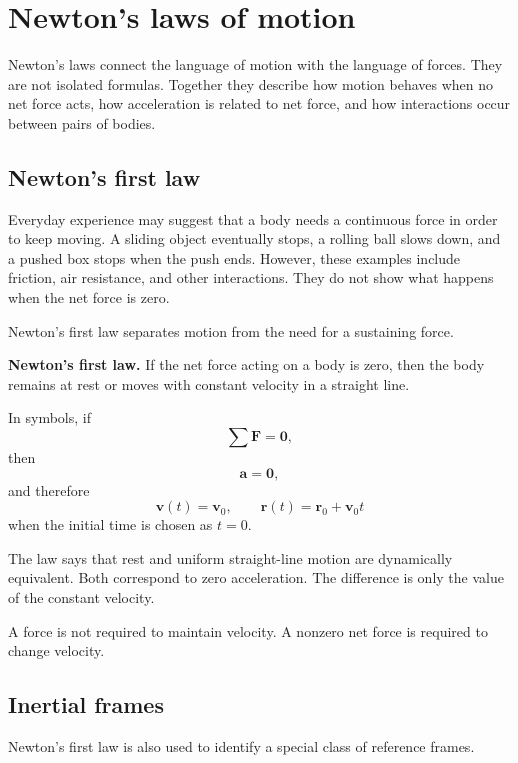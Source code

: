 \section{Newton's laws of motion}

Newton's laws connect the language of motion with the language of forces. They are not isolated formulas. Together they describe how motion behaves when no net force acts, how acceleration is related to net force, and how interactions occur between pairs of bodies.

\subsection{Newton's first law}

Everyday experience may suggest that a body needs a continuous force in order to keep moving. A sliding object eventually stops, a rolling ball slows down, and a pushed box stops when the push ends. However, these examples include friction, air resistance, and other interactions. They do not show what happens when the net force is zero.

Newton's first law separates motion from the need for a sustaining force.

\begin{theorembox}
\textbf{Newton's first law.} If the net force acting on a body is zero, then the body remains at rest or moves with constant velocity in a straight line.
\end{theorembox}

In symbols, if
\[
\sum \mathbf{F}=\mathbf{0},
\]
then
\[
\mathbf{a}=\mathbf{0},
\]
and therefore
\[
\mathbf{v}(t)=\mathbf{v}_0,
\qquad
\mathbf{r}(t)=\mathbf{r}_0+\mathbf{v}_0t
\]
when the initial time is chosen as \(t=0\).

The law says that rest and uniform straight-line motion are dynamically equivalent. Both correspond to zero acceleration. The difference is only the value of the constant velocity.

\begin{remarkbox}
A force is not required to maintain velocity. A nonzero net force is required to change velocity.
\end{remarkbox}

\subsection{Inertial frames}

Newton's first law is also used to identify a special class of reference frames.

